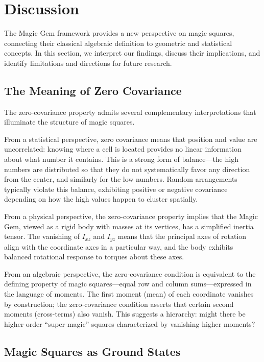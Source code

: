 \section{Discussion}
\label{sec:discussion}

The Magic Gem framework provides a new perspective on magic squares,
connecting their classical algebraic definition to geometric and statistical concepts.
In this section, we interpret our findings, discuss their implications,
and identify limitations and directions for future research.

\subsection{The Meaning of Zero Covariance}

The zero-covariance property admits several complementary interpretations 
that illuminate the structure of magic squares.

From a statistical perspective, zero covariance means that position and value are uncorrelated:
knowing where a cell is located provides no linear information about what number it contains.
This is a strong form of balance---the high numbers are distributed so that they do not systematically 
favor any direction from the center, and similarly for the low numbers.
Random arrangements typically violate this balance, exhibiting positive or negative covariance
depending on how the high values happen to cluster spatially.

From a physical perspective, the zero-covariance property implies that the Magic Gem, 
viewed as a rigid body with masses at its vertices, has a simplified inertia tensor.
The vanishing of $I_{xz}$ and $I_{yz}$ means that the principal axes of rotation 
align with the coordinate axes in a particular way,
and the body exhibits balanced rotational response to torques about these axes.

From an algebraic perspective, the zero-covariance condition is equivalent to the defining property 
of magic squares---equal row and column sums---expressed in the language of moments.
The first moment (mean) of each coordinate vanishes by construction;
the zero-covariance condition asserts that certain second moments (cross-terms) also vanish.
This suggests a hierarchy: might there be higher-order ``super-magic'' squares 
characterized by vanishing higher moments?

\subsection{Magic Squares as Ground States}

